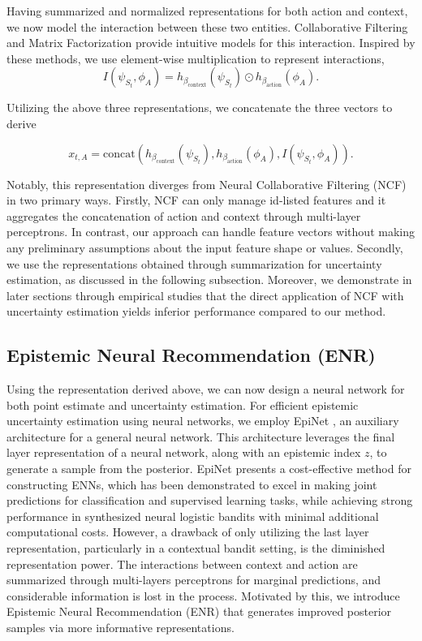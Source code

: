 Having summarized and normalized representations for both action and context, we now model the interaction between these two entities. Collaborative Filtering \cite{resnick1994grouplens, goldberg1992using, herlocker2000explaining} and Matrix Factorization \cite{koren2009matrix} provide intuitive models for this interaction. Inspired by these methods, we use element-wise multiplication to represent interactions,
\begin{equation}
    I(\psi_{S_t}, \phi_A) = h_{\beta_{\text{context}}}(\psi_{S_t}) \odot h_{\beta_{\text{action}}}(\phi_A).
\end{equation}

Utilizing the above three representations, we concatenate the three vectors to derive

\begin{equation} \label{eq:x}
x_{t, A} = \text{concat}\left(h_{\beta_{\text{context}}}(\psi_{S_t}), h_{\beta_{\text{action}}}(\phi_A), I(\psi_{S_t}, \phi_A)\right).
\end{equation}

Notably, this representation diverges from Neural Collaborative Filtering (NCF) \cite{he2017neural} in two primary ways. Firstly, NCF can only manage id-listed features and it aggregates the concatenation of action and context through multi-layer perceptrons. In contrast, our approach can handle feature vectors without making any preliminary assumptions about the input feature shape or values. Secondly, we use the representations obtained through summarization for uncertainty estimation, as discussed in the following subsection. Moreover, we demonstrate in later sections through empirical studies that the direct application of NCF with uncertainty estimation yields inferior performance compared to our method.

\subsection{Epistemic Neural Recommendation (ENR)}
Using the representation derived above, we can now design a neural network for both point estimate and uncertainty estimation. For efficient epistemic uncertainty estimation using neural networks, we employ EpiNet \cite{osband2021epistemic}, an auxiliary architecture for a general neural network. This architecture leverages the final layer representation of a neural network, along with an epistemic index $z$, to generate a sample from the posterior. EpiNet presents a cost-effective method for constructing ENNs, which has been demonstrated to excel in making joint predictions for classification and supervised learning tasks, while achieving strong performance in synthesized neural logistic bandits with minimal additional computational costs. However, a drawback of only utilizing the last layer representation, particularly in a contextual bandit setting, is the diminished representation power. The interactions between context and action are summarized through multi-layers perceptrons for marginal predictions, and considerable information is lost in the process. Motivated by this, we introduce Epistemic Neural Recommendation (ENR) that generates improved posterior samples via more informative representations.

